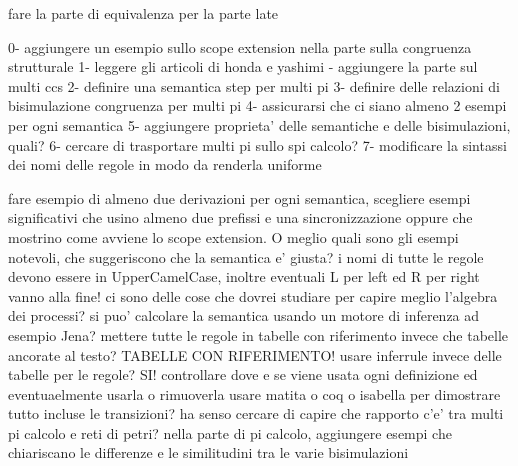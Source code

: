 
fare la parte di equivalenza per la parte late







0- aggiungere un esempio sullo scope extension nella parte sulla congruenza strutturale
1- leggere gli articoli di honda e yashimi
 - aggiungere la parte sul multi ccs
2- definire una semantica step per multi pi
3- definire delle relazioni di bisimulazione congruenza per multi pi
4- assicurarsi che ci siano almeno 2 esempi per ogni semantica
5- aggiungere proprieta' delle semantiche e delle bisimulazioni, quali?
6- cercare di trasportare multi pi sullo spi calcolo?
7- modificare la sintassi dei nomi delle regole in modo da renderla uniforme


fare esempio di almeno due derivazioni per ogni semantica, scegliere esempi significativi che usino almeno due prefissi e una sincronizzazione oppure che mostrino come avviene lo scope extension.
O meglio quali sono gli esempi notevoli, che suggeriscono che la semantica e' giusta?
i nomi di tutte le regole devono essere in UpperCamelCase, inoltre eventuali L per left ed R per right vanno alla fine!
ci sono delle cose che dovrei studiare per capire meglio l'algebra dei processi?
si puo' calcolare la semantica usando un motore di inferenza ad esempio Jena?
mettere tutte le regole in tabelle con riferimento invece che tabelle ancorate al testo? TABELLE CON RIFERIMENTO!
usare inferrule invece delle tabelle per le regole? SI!
controllare dove e se viene usata ogni definizione ed eventuaelmente usarla o rimuoverla
usare matita o coq o isabella per dimostrare tutto incluse le transizioni?
ha senso cercare di capire che rapporto c'e' tra multi pi calcolo e reti di petri?
nella parte di pi calcolo, aggiungere esempi che chiariscano le differenze e le similitudini tra le varie bisimulazioni



